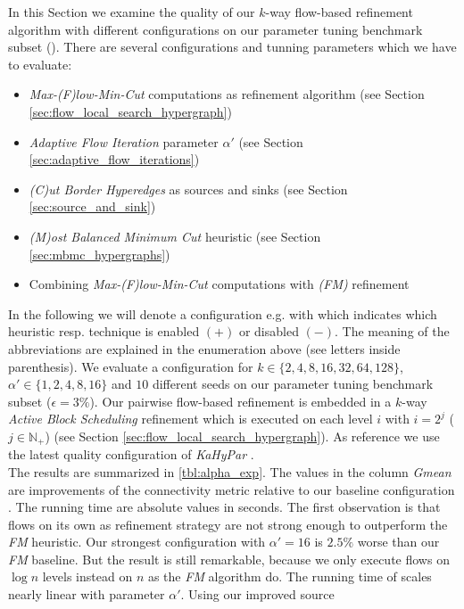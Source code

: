 In this Section we examine the quality of our $k$-way flow-based refinement algorithm with
different configurations on our parameter tuning benchmark subset ().
There are several configurations and tunning parameters which we have to evaluate:
\begin{itemize}
\item \emph{Max-(F)low-Min-Cut} computations as refinement algorithm (see Section \ref{sec:flow_local_search_hypergraph})
\item \emph{Adaptive Flow Iteration} parameter $\alpha'$ (see Section \ref{sec:adaptive_flow_iterations})
\item \emph{(C)ut Border Hyperedges} as sources and sinks (see Section \ref{sec:source_and_sink})
\item \emph{(M)ost Balanced Minimum Cut} heuristic (see Section \ref{sec:mbmc_hypergraphs})
\item Combining \emph{Max-(F)low-Min-Cut} computations with \emph{(FM)} refinement
\end{itemize}
In the following we will denote a configuration e.g. with \FlowVariant{+}{-}{-}{-} which indicates
which heuristic resp. technique is enabled $(+)$ or disabled $(-)$. The meaning of the 
abbreviations are explained in the enumeration above (see letters inside parenthesis). We evaluate
a configuration for $k \in \{2,4,8,16,32,64,128\}$, $\alpha' \in \{1,2,4,8,16\}$
and $10$ different seeds on our parameter tuning benchmark subset ($\epsilon = 3\%$). 
Our pairwise flow-based refinement is embedded in a $k$-way \emph{Active Block Scheduling}
refinement which is executed on each level $i$ with $i = 2^j$ ($j \in \mathbb{N}_+$) 
(see Section \ref{sec:flow_local_search_hypergraph}). As reference we use the 
latest quality configuration of \emph{KaHyPar} \cite{heuer2017improving}. \\
The results are summarized in \autoref{tbl:alpha_exp}. The values
in the column \emph{Gmean} are improvements of the connectivity metric
relative to our baseline configuration \FlowVariant{-}{-}{-}{+}. The running
time are absolute values in seconds. The first observation is that flows on
its own as refinement strategy are not strong enough to outperform the
\emph{FM} heuristic. Our strongest configuration with $\alpha' = 16$
is $2.5\%$ worse than our \emph{FM} baseline. But the result 
is still remarkable, because we only execute flows on $\log{n}$ levels
instead on $n$ as the \emph{FM} algorithm do. The running time of
scales nearly linear with parameter $\alpha'$. Using our improved source 

